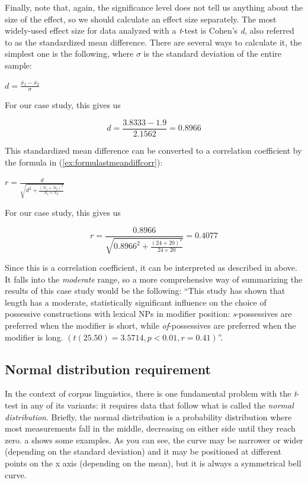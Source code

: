 Finally, note that, again, the significance  level does not tell us anything about the size of the effect, so we should calculate an effect size  separately. The most widely\hyp{}used effect size for data analyzed with a \textit{t}-test  is Cohen's \textit{d}, also referred to as the standardized mean  difference. There are several ways to calculate it, the simplest one is the following, where $\sigma$ is the standard deviation of the entire sample:

\begin{exe}
\ex $\displaystyle{d = \frac{\overline{x_1} - \overline{x_2}}{\sigma}}$
\label{ex:formulastmeandiff}
\end{exe}
For our case study, this gives us

\[d =\frac{3.8333 - 1.9}{2.1562} = 0.8966\]

This standardized mean  difference can be converted to a correlation  coefficient by the formula in (\ref{ex:formulastmeandiffcorr}):

\begin{exe}
\ex $\displaystyle{r = \frac d{\sqrt{d^2 + \frac{(N_1 + N_2)^2}{N_1 \times N_2}}}}$
\label{ex:formulastmeandiffcorr}
\end{exe}
For our case study, this gives us

\[r = \frac{0.8966}{\sqrt{0.8966^2 + \frac{(24 + 20)^2}{24 \times 20}}} = 0.4077\]

Since this is a correlation  coefficient, it can be interpreted as described in  above. It falls into the \textit{moderate} range, so a more comprehensive way of summarizing the results of this case study would be the following: ``This study has shown that length  has a moderate, statistically significant  influence on the choice of possessive  constructions with lexical NPs in modifier position: \textit{s}-pos\-ses\-sives are preferred when the modifier is short, while \textit{of}-possessives are preferred when the modifier is long. $(t(25.50) = 3.5714, p < 0.01, r = 0.41)$''.

\subsection{Normal distribution requirement}
\label{sec:normaldistribution}

In the context of corpus linguistics, there is one fundamental problem with the \textit{t}-test  in any of its variants: it requires data that follow what is called the \textit{normal distribution}. Briefly, the normal distribution  is a probability  distribution where most measurements  fall in the middle, decreasing on either side until they reach zero. a shows some examples. As you can see, the curve may be narrower or wider (depending on the standard deviation) and it may be positioned at different points on the x axis (depending on the mean),  but it is always a symmetrical bell curve.

